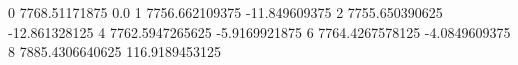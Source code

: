0 7768.51171875 0.0
1 7756.662109375 -11.849609375
2 7755.650390625 -12.861328125
4 7762.5947265625 -5.9169921875
6 7764.4267578125 -4.0849609375
8 7885.4306640625 116.9189453125
